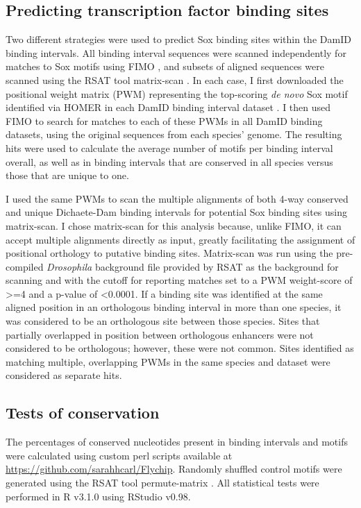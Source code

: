 \subsection{Predicting transcription factor binding sites}
Two different strategies were used to predict Sox binding sites within the DamID binding intervals. All binding interval sequences were scanned independently for matches to Sox motifs using FIMO \citep{grant_fimo:_2011}, and subsets of aligned sequences were scanned using the RSAT tool matrix-scan \citep{sand_analyzing_2008,turatsinze_using_2008}. In each case, I first downloaded the positional weight matrix (PWM) representing the top-scoring \emph{de novo} Sox motif identified via HOMER in each DamID binding interval dataset \citep{heinz_simple_2010}. I then used FIMO to search for matches to each of these PWMs in all DamID binding datasets, using the original sequences from each species’ genome. The resulting hits were used to calculate the average number of motifs per binding interval overall, as well as in binding intervals that are conserved in all species versus those that are unique to one.

I used the same PWMs to scan the multiple alignments of both 4-way conserved and unique Dichaete-Dam binding intervals for potential Sox binding sites using matrix-scan. I chose matrix-scan for this analysis because, unlike FIMO, it can accept multiple alignments directly as input, greatly facilitating the assignment of positional orthology to putative binding sites. Matrix-scan was run using the pre-compiled \emph{Drosophila} background file provided by RSAT as the background for scanning and with the cutoff for reporting matches set to a PWM weight-score of \textgreater=4 and a p-value of \textless 0.0001. If a binding site was identified at the same aligned position in an orthologous binding interval in more than one species, it was considered to be an orthologous site between those species. Sites that partially overlapped in position between orthologous enhancers were not considered to be orthologous; however, these were not common. Sites identified as matching multiple, overlapping PWMs in the same species and dataset were considered as separate hits. 

\subsection{Tests of conservation}
The percentages of conserved nucleotides present in binding intervals and motifs were calculated using custom perl scripts available at \url{https://github.com/sarahhcarl/Flychip}. Randomly shuffled control motifs were generated using the RSAT tool permute-matrix \citep{thomas-chollier_rsat_2011}. All statistical tests were performed in R v3.1.0 using RStudio v0.98.

